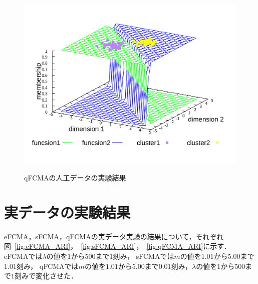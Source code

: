 \documentclass[twocolumn, a4paper]{icethesisabst}
\begin{document}
\begin{figure}[htbp]
\begin{minipage}{0.43\hsize}
  \includegraphics[width=\linewidth]{qFCMA-Em11-Lambda10000.pdf}
  \label{fig:qFCMA-Em11-Lambda10000}
 \end{minipage}
 \caption{qFCMAの人工データの実験結果}
\end{figure}

\section{実データの実験結果}
eFCMA，sFCMA，qFCMAの実データ実験の結果について，それぞれ図~\ref{fig:eFCMA_ARI}，~\ref{fig:sFCMA_ARI}，~\ref{fig:qFCMA_ARI}に示す．
eFCMAでは$\lambda$の値を$1$から$500$まで$1$刻み，
sFCMAでは$m$の値を$1.01$から$5.00$まで$1.01$刻み，
qFCMAでは$m$の値を$1.01$から$5.00$まで$0.01$刻み，$\lambda$の値を$1$から$500$まで$1$刻みで変化させた．
\end{document}
